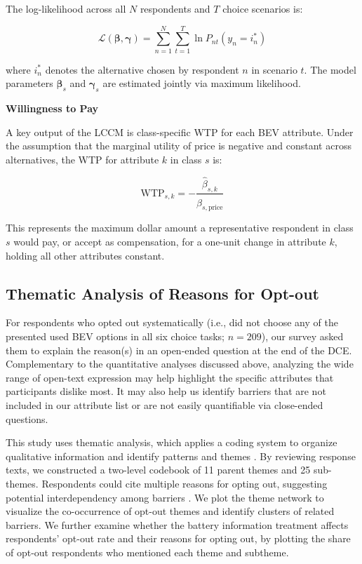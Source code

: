 \documentclass[a4paper,fleqn]{cas-sc}   %
\begin{document}
The log-likelihood across all $N$ respondents and $T$ choice scenarios is:

\begin{equation}
    \mathcal{L}(\boldsymbol{\beta}, \boldsymbol{\gamma}) = \sum_{n=1}^{N} \sum_{t=1}^{T} \ln P_{nt}(y_n = i_n^*)
    \label{eq:loglik}
\end{equation}

\noindent where $i_n^*$ denotes the alternative chosen by respondent $n$ in scenario $t$. The model parameters $\boldsymbol{\beta}_s$ and $\boldsymbol{\gamma}_s$ are estimated jointly via maximum likelihood.

\vspace{\baselineskip}
\noindent \textbf{Willingness to Pay} \par

A key output of the LCCM is class-specific WTP for each BEV attribute. Under the assumption that the marginal utility of price is negative and constant across alternatives, the WTP for attribute $k$ in class $s$ is:

\begin{equation}
    \text{WTP}_{s,k} = -\frac{\hat{\beta}_{s,k}}{\hat{\beta}_{s,\text{price}}}
    \label{eq:wtp}
\end{equation}

\noindent This represents the maximum dollar amount a representative respondent in class $s$ would pay, or accept as compensation, for a one-unit change in attribute $k$, holding all other attributes constant.

\subsection{Thematic Analysis of Reasons for Opt-out}
For respondents who opted out systematically (i.e., did not choose any of the presented used BEV options in all six choice tasks; $n=209$), our survey asked them to explain the reason(s) in an open-ended question at the end of the DCE. Complementary to the quantitative analyses discussed above, analyzing the wide range of open-text expression may help highlight the specific attributes that participants dislike most. It may also help us identify barriers that are not included in our attribute list or are not easily quantifiable via close-ended questions. 

This study uses thematic analysis, which applies a coding system to organize qualitative information and identify patterns and themes \parencite{braunUsingThematicAnalysis2006}. By reviewing response texts, we constructed a two-level codebook of 11 parent themes and 25 sub-themes. Respondents could cite multiple reasons for opting out, suggesting potential interdependency among barriers \parencite{krishnaUnderstandingIdentifyingBarriers2021}. We plot the theme network to visualize the co-occurrence of opt-out themes and identify clusters of related barriers. We further examine whether the battery information treatment affects respondents' opt-out rate and their reasons for opting out, by plotting the share of opt-out respondents who mentioned each theme and subtheme. 
\end{document}
